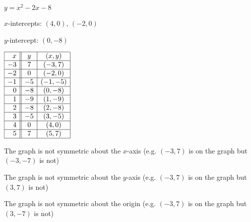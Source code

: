 {$y = x^2-2x-8$}
{$x$-intercepts:  $(4,0)$, $(-2,0)$ \smallskip

$y$-intercept: $(0, -8)$  \smallskip

$\begin{array}{|r||c|c|}  

\hline
 x & y & (x,y) \\ \hline
-3 & 7 & (-3,7) \\ \hline
-2 & 0 & (-2, 0) \\  \hline
-1 & -5 & (-1, -5) \\ \hline
 0 & -8 & (0, -8) \\ \hline
 1 & -9 & (1, -9) \\ \hline
 2 & -8 & (2, -8) \\ \hline
 3 & -5 & (3,-5) \\ \hline
 4 & 0 & (4,0) \\ \hline
 5 & 7 & (5,7) \\ \hline
 
\end{array}$  \smallskip


\smallskip

The graph is not symmetric about the $x$-axis (e.g. $(-3, 7)$ is on the graph but $(-3, -7)$ is not) \smallskip

The graph is  not symmetric about the $y$-axis (e.g. $(-3, 7)$ is on the graph but $(3, 7)$ is not) \smallskip

The graph is not symmetric about the origin (e.g. $(-3, 7)$ is on the graph but $(3, -7)$ is not)
}